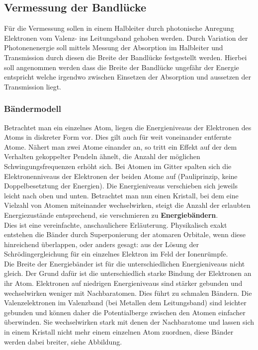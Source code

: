 \documentclass[12pt]{article}
\begin{document}
\subsection{Vermessung der Bandlücke}
Für die Vermessung sollen in einem Halbleiter durch photonische Anregung Elektronen vom Valenz- ins Leitungsband gehoben werden. Durch Variation der Photonenenergie soll mittels Messung der Absorption im Halbleiter und Transmission durch diesen die Breite der Bandlücke festgestellt werden. Hierbei soll angenommen werden dass die Breite der Bandlücke ungefähr der Energie entspricht welche irgendwo zwischen Einsetzen der Absorption und aussetzen der Transmission liegt.

\subsubsection{Bändermodell}
Betrachtet man ein einzelnes Atom, liegen die Energieniveaus der Elektronen des Atoms in diskreter Form vor. Dies gilt 
auch für weit voneinander entfernte Atome. 
Nähert man zwei Atome einander an, so tritt ein Effekt auf der dem Verhalten gekoppelter Pendeln ähnelt, die Anzahl der möglichen Schwingungsfrequenzen erhöht sich. Bei Atomen im Gitter spalten sich die Elektronenniveaus
der Elektronen der beiden Atome auf (Pauliprinzip, keine Doppelbesetztung der Energien). Die Energieniveaus 
verschieben sich jeweils leicht nach oben und unten. Betrachtet man nun einen Kristall, bei dem eine Vielzahl 
von Atomen miteinander wechselwirken, steigt die Anzahl der erlaubten Energiezustände entsprechend, sie 
verschmieren zu \textbf{Energiebändern}.\\

Dies ist eine vereinfachte, anschaulichere Erläuterung. Physikalisch exakt entstehen die Bänder durch Superponierung der
atomaren Orbitale, wenn diese hinreichend überlappen, oder anders gesagt: aus der Lösung der Schrödingergleichung für
ein einzelnes Elektron im Feld der Ionenrümpfe.\\

Die Breite der Energiebänder ist für die unterschiedlichen Energieniveaus nicht gleich. Der Grund dafür ist
die unterschiedlich starke Bindung der Elektronen an ihr Atom. Elektronen auf niedrigen Energieniveaus sind stärker
gebunden und wechselwirken weniger mit Nachbaratomen. Dies führt zu schmalen Bändern. Die Valenzelektronen im Valenzband
(bei Metallen dem Leitungsband) sind leichter gebunden und können daher die Potentialberge zwischen den Atomen
einfacher überwinden. Sie wechselwirken stark mit denen der Nachbaratome und lassen sich in einem Kristall nicht mehr 
einem einzelnen Atom zuordnen, diese Bänder werden dabei breiter, siehe Abbildung.
\end{document}
